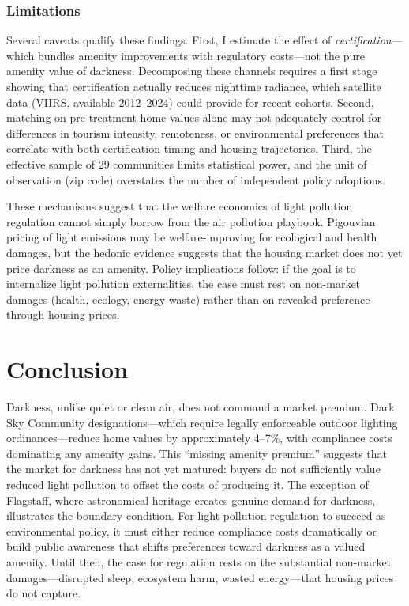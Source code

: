 \documentclass[12pt]{article}
\begin{document}
\subsubsection*{Limitations} Several caveats qualify these findings. First, I estimate the effect of \textit{certification}---which bundles amenity improvements with regulatory costs---not the pure amenity value of darkness. Decomposing these channels requires a first stage showing that certification actually reduces nighttime radiance, which satellite data (VIIRS, available 2012--2024) could provide for recent cohorts. Second, matching on pre-treatment home values alone may not adequately control for differences in tourism intensity, remoteness, or environmental preferences that correlate with both certification timing and housing trajectories. Third, the effective sample of 29 communities limits statistical power, and the unit of observation (zip code) overstates the number of independent policy adoptions.

These mechanisms suggest that the welfare economics of light pollution regulation cannot simply borrow from the air pollution playbook. Pigouvian pricing of light emissions may be welfare-improving for ecological and health damages, but the hedonic evidence suggests that the housing market does not yet price darkness as an amenity. Policy implications follow: if the goal is to internalize light pollution externalities, the case must rest on non-market damages (health, ecology, energy waste) rather than on revealed preference through housing prices.

\section{Conclusion}

Darkness, unlike quiet or clean air, does not command a market premium. Dark Sky Community designations---which require legally enforceable outdoor lighting ordinances---reduce home values by approximately 4--7\%, with compliance costs dominating any amenity gains. This ``missing amenity premium'' suggests that the market for darkness has not yet matured: buyers do not sufficiently value reduced light pollution to offset the costs of producing it. The exception of Flagstaff, where astronomical heritage creates genuine demand for darkness, illustrates the boundary condition. For light pollution regulation to succeed as environmental policy, it must either reduce compliance costs dramatically or build public awareness that shifts preferences toward darkness as a valued amenity. Until then, the case for regulation rests on the substantial non-market damages---disrupted sleep, ecosystem harm, wasted energy---that housing prices do not capture.
\end{document}

